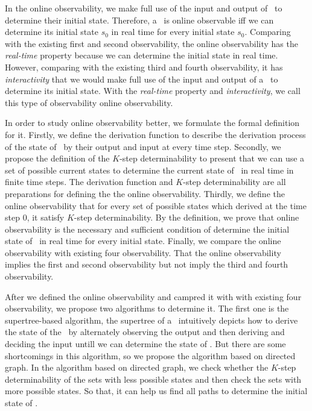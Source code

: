 In the online observability, we make full use of the input and output of \BCNs\ to determine their initial state. Therefore, a \BCN\ is online observable iff we can determine its initial state $s_0$ in real time for every initial state $s_0$. Comparing with the existing first and second observability, the online observability has the {\em real-time} property because we can determine the initial state in real time. However, comparing with the existing third and fourth observability, it has {\em interactivity} that we would make full use of the input and output of a \BCN\ to determine its initial state. With the {\em real-time} property and {\em interactivity}, we call this type of observability online observability. %

In order to study online observability better, we formulate the formal definition for it. Firstly, we define the derivation function to describe the derivation process of the state of \BCNs\ by their output and input at every time step. Secondly, we propose the definition of the $K$-step determinability to present that we can use a set of possible current states to determine the current state of \BCNs\ in real time in finite time steps. The derivation function and $K$-step determinability are all preparations for defining the the online observability. Thirdly, we define the online observability that for every set of possible states which derived at the time step $0$, it satisfy $K$-step determinability. By the definition, we prove that online observability is the necessary and sufficient condition of determine the initial state of \BCNs\ in real time for every initial state. Finally, we compare the online observability with existing four observability. That the online observability implies the first and second observability but not imply the third and fourth observability.

After we defined the online observability and campred it with with existing four observability, we propose two algorithms to determine it. The first one is the supertree-based algorithm, the supertree of a \BCN\ intuitively depicts how to derive the state of the \BCN\ by alternately observing the output and then deriving and deciding the input untill we can determine the state of \BCN. But there are some shortcomings in this algorithm, so we propose the algorithm based on directed graph. In the algorithm based on directed graph, we check whether the $K$-step determinability of the sets with less possible states and then check the sets with more possible states. So that, it can help us find all paths to determine the initial state of \BCNs.

